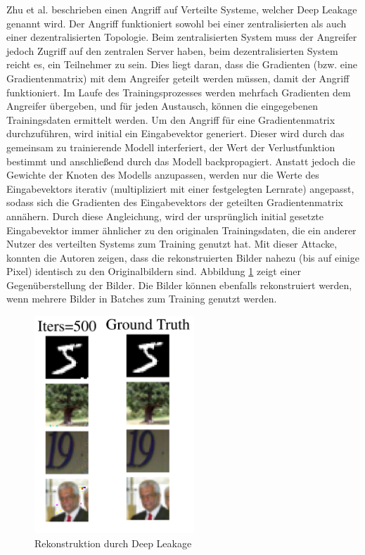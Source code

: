 Zhu et al. \cite{P-18} beschrieben einen Angriff auf Verteilte Systeme, welcher Deep Leakage genannt wird.
Der Angriff funktioniert sowohl bei einer zentralisierten als auch einer dezentralisierten Topologie. 
Beim zentralisierten System muss der Angreifer jedoch Zugriff auf den zentralen Server haben, beim dezentralisierten System reicht es, ein Teilnehmer zu sein.
Dies liegt daran, dass die Gradienten (bzw. eine Gradientenmatrix) mit dem Angreifer geteilt werden müssen, damit der Angriff funktioniert.
Im Laufe des Trainingsprozesses werden mehrfach Gradienten dem Angreifer übergeben, und für jeden Austausch, können die eingegebenen Trainingsdaten ermittelt werden.
Um den Angriff für eine Gradientenmatrix durchzuführen, wird initial ein Eingabevektor generiert.
Dieser wird durch das gemeinsam zu trainierende Modell interferiert, der Wert der Verlustfunktion bestimmt und anschließend durch das Modell backpropagiert.
Anstatt jedoch die Gewichte der Knoten des Modells anzupassen, werden nur die Werte des Eingabevektors iterativ (multipliziert mit einer festgelegten Lernrate) angepasst, sodass sich die Gradienten des Eingabevektors der geteilten Gradientenmatrix annähern.
Durch diese Angleichung, wird der ursprünglich initial gesetzte Eingabevektor immer ähnlicher zu den originalen Trainingsdaten, die ein anderer Nutzer des verteilten Systems zum Training genutzt hat.
Mit dieser Attacke, konnten die Autoren zeigen, dass die rekonstruierten Bilder nahezu (bis auf einige Pixel) identisch zu den Originalbildern sind. 
Abbildung \ref{fig:deep_leakage} zeigt einer Gegenüberstellung der Bilder.
Die Bilder können ebenfalls rekonstruiert werden, wenn mehrere Bilder in Batches zum Training genutzt werden.

\begin{figure}[!htb]
    \centering
    \includegraphics[width=6cm]{figures/deep_leakage}
    \caption{Rekonstruktion durch Deep Leakage \cite{P-18}}
    \label{fig:deep_leakage}
\end{figure} 

